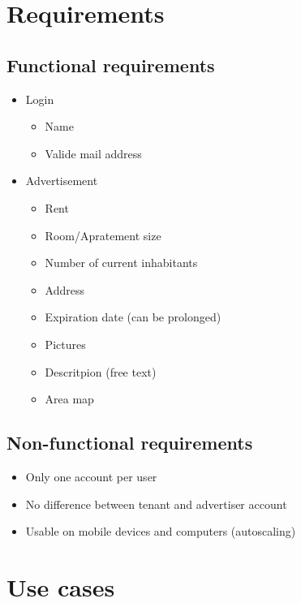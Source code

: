 \documentclass[a4paper,11pt]{article}
\begin{document}
\section{Requirements}
\subsection*{Functional requirements}
\begin{itemize}
  \item Login
  \begin{itemize}
    \item Name
    \item Valide mail address
  \end{itemize}
  \item Advertisement
  \begin{itemize}
    \item Rent
    \item Room/Apratement size
    \item Number of current inhabitants
    \item Address
    \item Expiration date (can be prolonged)
    \item Pictures
    \item Descritpion (free text)
    \item Area map
  \end{itemize}
\end{itemize}
\subsection*{Non-functional requirements}
\begin{itemize}
  \item Only one account per user
  \item No difference between tenant and advertiser account
  \item Usable on mobile devices and computers (autoscaling)
\end{itemize}

\section{Use cases}
\end{document}

